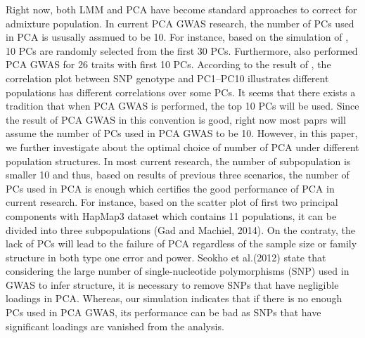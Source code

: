 \documentclass[11pt]{article}
\begin{document}
Right now, both LMM and PCA have become standard approaches to correct for admixture population. In current PCA GWAS research, the number of PCs used in PCA is ususally assmued to be 10.
For instance, based on the simulation of \citet{hoffman_correcting_2013}, 10 PCs are randomly selected from the first 30 PCs.
Furthermore, \citet{wojcik_genetic_2019} also performed PCA GWAS for 26 traits with first 10 PCs.
According to the result of \citet{wojcik_genetic_2019}, the correlation plot between SNP genotype and PC1–PC10 illustrates different populations has different correlations over some PCs.
It seems that there exists a tradition that when PCA GWAS is performed, the top 10 PCs will be used.
Since the result of PCA GWAS in this convention is good, right now most paprs will assume the number of PCs used in PCA GWAS to be 10.
However, in this paper, we further investigate about the optimal choice of number of PCA under different population structures.
In most current research, the number of subpopulation is smaller 10 and thus, based on results of previous three scenarios, the number of PCs used in PCA is enough which certifies the good performance of PCA  in current research.
For instance, based on the scatter plot of first two principal components with HapMap3 dataset which contains 11 populations, it can be divided into three subpopulations (Gad and Machiel, 2014).
On the contraty, the lack of PCs will lead to the failure of PCA regardless of the sample size or family structure in both type one error and power.
Seokho et al.(2012) state that considering the large number of single-nucleotide polymorphisms (SNP) used in GWAS to infer structure, it is necessary to remove SNPs that have negligible loadings in PCA.
Whereas, our simulation indicates that if there is no enough PCs used in PCA GWAS, its performance can be bad as SNPs that have significant loadings are vanished from the analysis.

\end{document}
